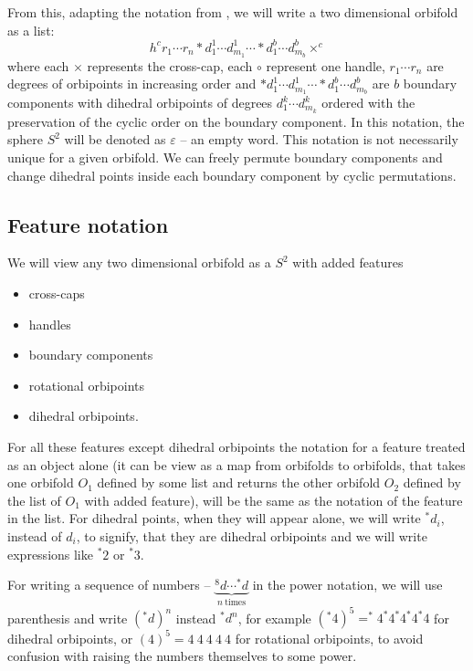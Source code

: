 From this, adapting the notation from \cite{Conway2016}, we will write 
a two dimensional 
orbifold as a list: 
\begin{equation}
h^cr_1\cdots r_n 
*d_1^1\cdots d_{m_1}^1 \cdots *d_1^b\cdots d_{m_b}^b\times^c
\end{equation}
where each $\times$ represents the cross-cap, 
each $\circ$ represent one handle, 
$r_1\cdots r_n$ are degrees of orbipoints in increasing order and 
$*d_1^1\cdots d_{m_1}^1 \cdots *d_1^b\cdots d_{m_b}^b$ are $b$ boundary components 
with dihedral orbipoints of degrees $d_1^k\cdots d_{m_k}^k$ ordered with the preservation 
of the cyclic order on the boundary component. 
In this notation, the sphere $S^2$ will be denoted as $\varepsilon$ -- an empty word.
This notation is not necessarily unique for a given orbifold. We can freely permute 
boundary components and change dihedral points inside each boundary component by cyclic 
permutations. 
\subsection{Feature notation}
We will view any two dimensional orbifold as a $S^2$ with added features
\begin{itemize}
\item cross-caps
\item handles
\item boundary components
\item rotational orbipoints
\item dihedral orbipoints.
\end{itemize}

For all these features except dihedral orbipoints 
the notation for a feature treated as an object alone (it can be view 
as a map from orbifolds to orbifolds, that takes one orbifold $O_1$ defined by some list and 
returns the other orbifold $O_2$ defined by the list of $O_1$ with added feature), will 
be the same as the notation of the feature in the list. For dihedral points, when they will appear 
alone, we will write $^*d_i$, instead of $d_i$, to signify, that they are dihedral orbipoints 
and we will write expressions like $^*2$ or $^*3$. 

For writing a sequence of numbers -- $\underbrace{^8d\cdots ^*d}_{n\ \mathrm{times}}$ 
in the power notation, we will use 
parenthesis and write $(^*d)^n$ instead $^*d^n$, for example 
$(^*4)^5 = ^*4^*4^*4^*4^*4$ for dihedral 
orbipoints, or $(4)^5 = 4\ 4\ 4\ 4\ 4$ for rotational orbipoints, to avoid confusion with 
raising the numbers themselves to some power. 

